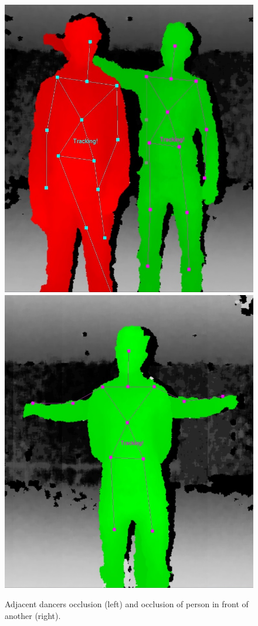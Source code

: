 \documentclass[10pt,a4paper]{article}
\begin{document}
\begin{figure}[H]
\center
\includegraphics[scale=0.2]{Occlusion1.jpg} 
\includegraphics[scale=0.1822]{Occlusion2.jpg} 
\caption{Adjacent dancers occlusion (left) and occlusion of person in front of another (right).}
\label{occlusion1}
\end{figure} 
\end{document}
